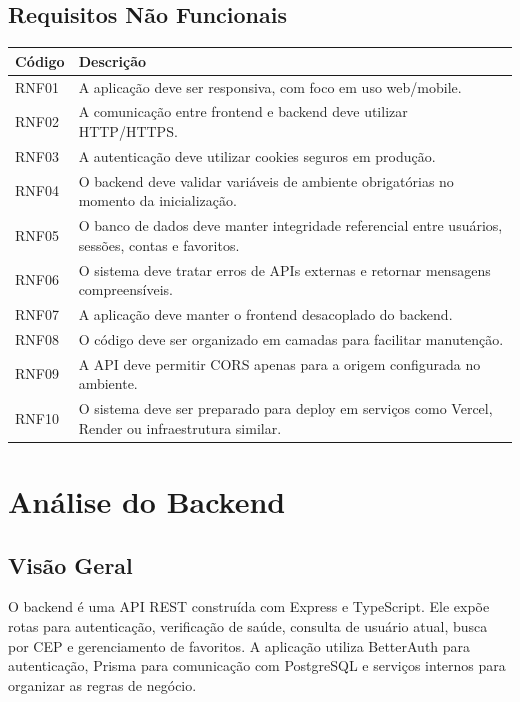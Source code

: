 \documentclass[
    12pt,
    oneside,
    openright,
    a4paper,
    english,
    brazil
]{abntex2}
\begin{document}
\section{Requisitos Não Funcionais}

\begin{longtable}{|p{2cm}|p{12cm}|}
\hline
\textbf{Código} & \textbf{Descrição} \\
\hline
RNF01 & A aplicação deve ser responsiva, com foco em uso web/mobile. \\
\hline
RNF02 & A comunicação entre frontend e backend deve utilizar HTTP/HTTPS. \\
\hline
RNF03 & A autenticação deve utilizar cookies seguros em produção. \\
\hline
RNF04 & O backend deve validar variáveis de ambiente obrigatórias no momento da inicialização. \\
\hline
RNF05 & O banco de dados deve manter integridade referencial entre usuários, sessões, contas e favoritos. \\
\hline
RNF06 & O sistema deve tratar erros de APIs externas e retornar mensagens compreensíveis. \\
\hline
RNF07 & A aplicação deve manter o frontend desacoplado do backend. \\
\hline
RNF08 & O código deve ser organizado em camadas para facilitar manutenção. \\
\hline
RNF09 & A API deve permitir CORS apenas para a origem configurada no ambiente. \\
\hline
RNF10 & O sistema deve ser preparado para deploy em serviços como Vercel, Render ou infraestrutura similar. \\
\hline
\end{longtable}


\chapter{Análise do Backend}

\section{Visão Geral}

O backend é uma API REST construída com Express e TypeScript. Ele expõe rotas para autenticação, verificação de saúde, consulta de usuário atual, busca por CEP e gerenciamento de favoritos. A aplicação utiliza BetterAuth para autenticação, Prisma para comunicação com PostgreSQL e serviços internos para organizar as regras de negócio.
\end{document}
